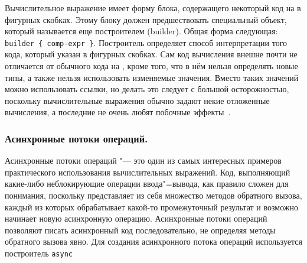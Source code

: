 Вычислительное выражение имеет форму блока, содержащего некоторый код на \fsharp{} в фигурных скобках.
Этому блоку должен предшествовать специальный объект, который называется еще построителем (builder).
Общая форма следующая: \lstinline[style=fsharpstyle]!builder { comp-expr }!.
Построитель определяет способ интерпретации того кода, который указан в фигурных скобках.
Сам код вычисления внешне почти не отличается от обычного кода на \fsharp{}, кроме того, что в нём нельзя определять новые типы, а также нельзя использовать изменяемые значения.
Вместо таких значений можно использовать ссылки, но делать это следует с большой осторожностью, поскольку вычислительные выражения обычно задают некие отложенные вычисления, а последние не очень любят побочные эффекты~\cite{fsharp_pfp_issue_5}.

\subsubsection{Асинхронные потоки операций. }
\label{ssub:tech:fsharp_async}
Асинхронные потоки операций "--- это один из самых интересных примеров практического использования вычислительных выражений.
Код, выполняющий какие-либо неблокирующие операции ввода"=вывода, как правило сложен для понимания, поскольку представляет из себя множество методов обратного вызова, каждый из которых обрабатывает какой-то промежуточный результат и возможно начинает новую асинхронную операцию.
Асинхронные потоки операций позволяют писать асинхронный код последовательно, не определяя методы обратного вызова явно.
Для создания асинхронного потока операций используется построитель \lstinline[style=fsharpstyle]!async!~\cite{fsharp_pfp_issue_5}
